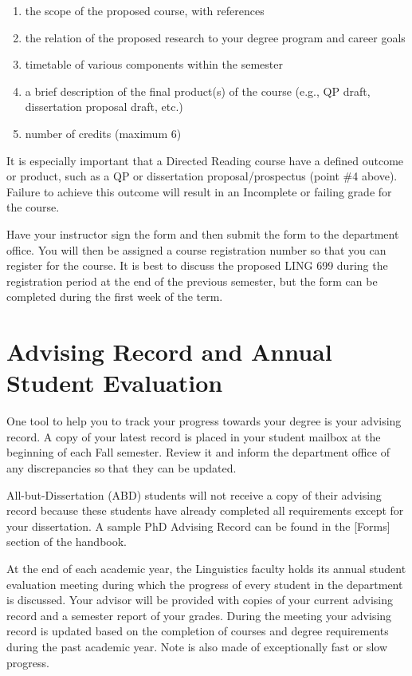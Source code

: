 \documentclass[
]{book}
\providecommand{\tightlist}{%
  \setlength{\itemsep}{0pt}\setlength{\parskip}{0pt}}
\begin{document}
\begin{enumerate}
\def\labelenumi{\arabic{enumi}.}
\tightlist
\item
  the scope of the proposed course, with references
\item
  the relation of the proposed research to your degree program and career goals
\item
  timetable of various components within the semester
\item
  a brief description of the final product(s) of the course (e.g., QP draft, dissertation proposal draft, etc.)
\item
  number of credits (maximum 6)
\end{enumerate}

It is especially important that a Directed Reading course have a defined outcome or product, such as a QP or dissertation proposal/prospectus (point \#4 above). {Failure to achieve this outcome will result in an Incomplete or failing grade for the course.}

Have your instructor sign the form and then submit the form to the department office. You will then be assigned a course registration number so that you can register for the course. It is best to discuss the proposed LING 699 during the registration period at the end of the previous semester, but the form can be completed during the first week of the term.

\section{Advising Record and Annual Student Evaluation}\label{advising-record-and-annual-student-evaluation}

One tool to help you to track your progress towards your degree is your advising record. A copy of your latest record is placed in your student mailbox at the beginning of each Fall semester. Review it and inform the department office of any discrepancies so that they can be updated.

All-but-Dissertation (ABD) students will not receive a copy of their advising record because these students have already completed all requirements except for your dissertation. A sample PhD Advising Record can be found in the {[}Forms{]} section of the handbook.

At the end of each academic year, the Linguistics faculty holds its annual student evaluation meeting during which the progress of every student in the department is discussed. Your advisor will be provided with copies of your current advising record and a semester report of your grades. During the meeting your advising record is updated based on the completion of courses and degree requirements during the past academic year. Note is also made of exceptionally fast or slow progress.
\end{document}
